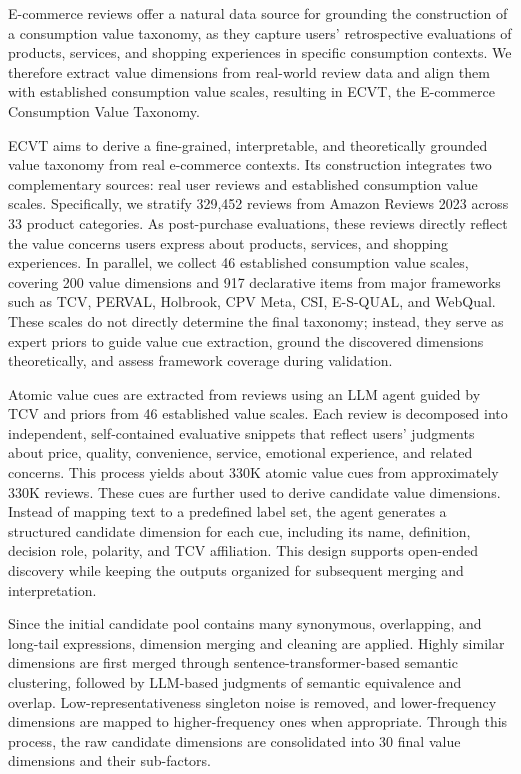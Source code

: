 \documentclass[11pt]{article}
\begin{document}
E-commerce reviews offer a natural data source for grounding the construction of a consumption value taxonomy, as they capture users’ retrospective evaluations of products, services, and shopping experiences in specific consumption contexts. We therefore extract value dimensions from real-world review data and align them with established consumption value scales, resulting in ECVT, the E-commerce Consumption Value Taxonomy.

ECVT aims to derive a fine-grained, interpretable, and theoretically grounded value taxonomy from real e-commerce contexts. Its construction integrates two complementary sources: real user reviews and established consumption value scales. Specifically, we stratify 329,452 reviews from Amazon Reviews 2023 across 33 product categories. As post-purchase evaluations, these reviews directly reflect the value concerns users express about products, services, and shopping experiences. In parallel, we collect 46 established consumption value scales, covering 200 value dimensions and 917 declarative items from major frameworks such as TCV, PERVAL, Holbrook, CPV Meta, CSI, E-S-QUAL, and WebQual. These scales do not directly determine the final taxonomy; instead, they serve as expert priors to guide value cue extraction, ground the discovered dimensions theoretically, and assess framework coverage during validation.

Atomic value cues are extracted from reviews using an LLM agent guided by TCV and priors from 46 established value scales. Each review is decomposed into independent, self-contained evaluative snippets that reflect users’ judgments about price, quality, convenience, service, emotional experience, and related concerns. This process yields about 330K atomic value cues from approximately 330K reviews. These cues are further used to derive candidate value dimensions. Instead of mapping text to a predefined label set, the agent generates a structured candidate dimension for each cue, including its name, definition, decision role, polarity, and TCV affiliation. This design supports open-ended discovery while keeping the outputs organized for subsequent merging and interpretation.

Since the initial candidate pool contains many synonymous, overlapping, and long-tail expressions, dimension merging and cleaning are applied. Highly similar dimensions are first merged through sentence-transformer-based semantic clustering, followed by LLM-based judgments of semantic equivalence and overlap. Low-representativeness singleton noise is removed, and lower-frequency dimensions are mapped to higher-frequency ones when appropriate. Through this process, the raw candidate dimensions are consolidated into 30 final value dimensions and their sub-factors.
\end{document}
